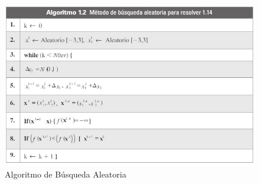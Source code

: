 \documentclass{article}
\begin{document}
\cite{Cuevas (2016)}
\begin{figure}[h!]
    \centering
    \includegraphics[width=15cm]{imgs/busqueda_aleatoria.JPG}
    \caption{Algoritmo de B\'usqueda Aleatoria}
    \label{fig:my_label}
\end{figure}
\end{document}
